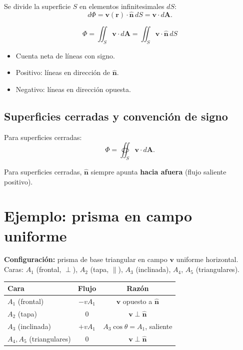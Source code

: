 \documentclass[12pt,a4paper]{article}
\begin{document}
Se divide la superficie $S$ en elementos infinitesimales $dS$:
\[
d\Phi = \mathbf{v}(\mathbf{r}) \cdot \hat{\mathbf{n}} \, dS
      = \mathbf{v} \cdot d\mathbf{A}.
\]

\begin{keybox}
  \[
  \boxed{\Phi = \iint_S \mathbf{v} \cdot d\mathbf{A}
         = \iint_S \mathbf{v} \cdot \hat{\mathbf{n}} \, dS}
  \]
\end{keybox}

\begin{itemize}[nosep]
  \item Cuenta neta de líneas con signo.
  \item Positivo: líneas en dirección de $\hat{\mathbf{n}}$.
  \item Negativo: líneas en dirección opuesta.
\end{itemize}

\subsection{Superficies cerradas y convención de signo}

Para superficies cerradas:
\[
\Phi = \oiint_S \mathbf{v} \cdot d\mathbf{A}.
\]

\begin{keybox}
  Para superficies cerradas, $\hat{\mathbf{n}}$ siempre apunta
  \textbf{hacia afuera} (flujo saliente positivo).
\end{keybox}

\section{Ejemplo: prisma en campo uniforme}

\textbf{Configuración:} prisma de base triangular en campo $\mathbf{v}$
uniforme horizontal. Caras: $A_1$ (frontal, $\perp$), $A_2$ (tapa,
$\parallel$), $A_3$ (inclinada), $A_4$, $A_5$ (triangulares).

\begin{center}
\begin{tabular}{lcc}
\toprule
\textbf{Cara} & \textbf{Flujo} & \textbf{Razón} \\
\midrule
$A_1$ (frontal) & $-v A_1$ & $\mathbf{v}$ opuesto a $\hat{\mathbf{n}}$ \\
$A_2$ (tapa)    & $0$      & $\mathbf{v} \perp \hat{\mathbf{n}}$ \\
$A_3$ (inclinada) & $+v A_1$ & $A_3\cos\theta = A_1$, saliente \\
$A_4, A_5$ (triangulares) & $0$ & $\mathbf{v} \perp \hat{\mathbf{n}}$ \\
\bottomrule
\end{tabular}
\end{center}
\end{document}
